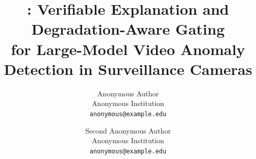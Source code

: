 \documentclass[10pt,twocolumn,letterpaper]{article}
\title{\evivad{}: Verifiable Explanation and Degradation-Aware Gating\\ for Large-Model Video Anomaly Detection in Surveillance Cameras}
\author{Anonymous Author\\
Anonymous Institution\\
{\tt\small anonymous@example.edu}
\and
Second Anonymous Author\\
Anonymous Institution\\
{\tt\small anonymous@example.edu}
}
\begin{document}
\maketitle







\clearpage
{
    \small
    
    
}

% 
\end{document}
